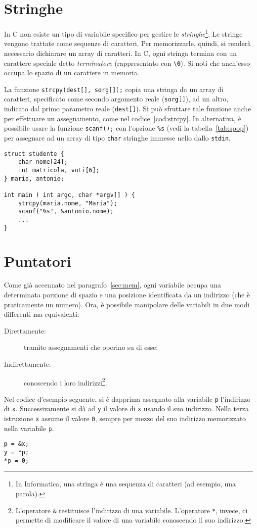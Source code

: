 	\section{Stringhe}
In C non esiste un tipo di variabile specifico per gestire le \emph{stringhe}\footnote{In Informatica, una stringa è una sequenza di caratteri (ad esempio, una parola).}. Le stringe vengono trattate come sequenze di caratteri. Per memorizzarle, quindi, si renderà necessario dichiarare un array di caratteri. In C, ogni stringa termina con un carattere speciale detto \emph{terminatore} (rappresentato con  \lstinline!\0!). Si noti che anch'esso occupa lo spazio di un carattere in memoria.

La funzione \lstinline!strcpy(dest[], sorg[]);! copia una stringa da un array di caratteri, specificato come secondo argomento reale (\lstinline!sorg[]!), ad un altro, indicato dal primo parametro reale (\lstinline!dest[]!). Si può sfruttare tale funzione anche per effettuare un assegnamento, come nel codice~\vref{cod:strcpy}. In alternativa, è possibile usare la funzione \lstinline!scanf();! con l'opzione \lstinline!%s!
(vedi la tabella~\vref{tab:spop}) per assegnare ad un array di tipo \lstinline!char! stringhe immesse nello dallo \lstinline!stdin!.
\begin{lstlisting}[caption={\em \lstinline!strcpy();! e \lstinline!scanf();!.}, label={cod:strcpy}]
struct studente {
	char nome[24];
	int matricola, voti[6];
} maria, antonio;

int main ( int argc, char *argv[] ) {
	strcpy(maria.nome, "Maria");
	scanf("%s", &antonio.nome);
	...
}
\end{lstlisting}


	\section{Puntatori}
	\label{sec:pointers}
Come già accennato nel paragrafo~\vref{sec:mem}, ogni variabile occupa una determinata porzione di spazio e una posizione identificata da un indirizzo (che è praticamente un numero). Ora, è possibile manipolare delle variabili in due modi differenti ma equivalenti:
\begin{description}
	\item [Direttamente:]
tramite assegnamenti che operino su di esse;
	\item [Indirettamente:]
conoscendo i loro indirizzi\footnote{L'operatore \lstinline!&! restituisce l'indirizzo di una variabile. L'operatore \lstinline!*!, invece, ci permette di modificare il valore di una variabile conoscendo il suo indirizzo.}.
\end{description}
Nel codice d'esempio seguente, si è dapprima assegnato alla variabile \lstinline!p! l'indirizzo di \lstinline!x!. Successivamente si dà ad \lstinline!y! il valore di \lstinline!x! usando il suo indirizzo. Nella terza istruzione \lstinline!x! assume il valore \lstinline!0!, sempre per mezzo del suo indirizzo memorizzato nella variabile \lstinline!p!.
\begin{lstlisting}
p = &x;
y = *p;
*p = 0;
\end{lstlisting}

